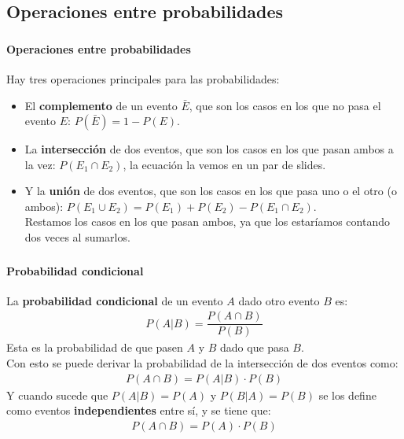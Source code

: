 \documentclass[../main.tex]{subfiles}
\begin{document}
\subsection{Operaciones entre probabilidades}

\begin{frame}
  \frametitle{\SECTIONA}
  \framesubtitle{Operaciones entre probabilidades}

  Hay tres operaciones principales para las probabilidades:
  \begin{itemize}
    \item<2-> El \textbf{complemento} de un evento \(\bar{E}\), que son los casos en los que no pasa el evento \(E\): \(P(\bar{E}) = 1 - P(E)\).
    \item<3-> La \textbf{intersección} de dos eventos, que son los casos en los que pasan ambos a la vez: \(P(E_{1} \cap E_{2})\), la ecuación la vemos en un par de slides.
    \item<4-> Y la \textbf{unión} de dos eventos, que son los casos en los que pasa uno o el otro (o ambos): \(P(E_{1} \cup E_{2}) = P(E_{1}) + P(E_{2}) - P(E_{1} \cap E_{2})\). \pause \\
      Restamos los casos en los que pasan ambos, ya que los estaríamos contando dos veces al sumarlos.
  \end{itemize}
\end{frame}

\begin{frame}
  \frametitle{\SECTIONA}
  \framesubtitle{Probabilidad condicional}

  La \textbf{probabilidad condicional} de un evento \(A\) dado otro evento \(B\) es:
  \begin{gather*}
    P(A | B) = \dfrac{P(A \cap B)}{P(B)}
  \end{gather*}
  Esta es la probabilidad de que pasen \(A\) y \(B\) dado que pasa \(B\). \pause \\
  Con esto se puede derivar la probabilidad de la intersección de dos eventos como:
  \begin{gather*}
    P(A \cap B) = P(A | B) \cdot P(B)
  \end{gather*} \pause
  Y cuando sucede que \(P(A|B) = P(A)\) y \(P(B|A) = P(B)\) se los define como eventos \textbf{independientes} entre sí, y se tiene que:
  \begin{gather*}
    P(A \cap B) = P(A) \cdot P(B)
  \end{gather*}
\end{frame}
\end{document}
